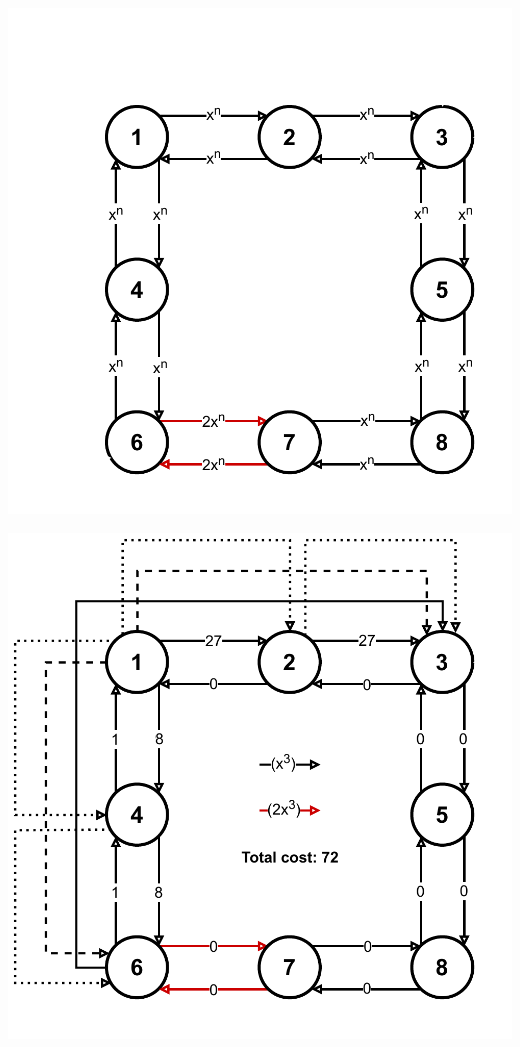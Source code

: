 {
    \begin{minipage}{0.3\textwidth}
        \includegraphics[width=\linewidth]{Img/cex_init.pdf}
    \end{minipage}
    \begin{minipage}{0.3\textwidth}
        \includegraphics[width=\linewidth]{Img/cex_greedy.pdf}

\end{minipage}}
